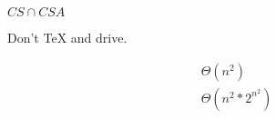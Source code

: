 \documentclass[14pt]{extarticle} %
\begin{document}
$CS \cap CSA$

Don't \TeX{} and drive.

\begin{gather}
  \Theta(n^2) \\
  \Theta(n^2 * 2^{n^2})
\end{gather}
\end{document}
